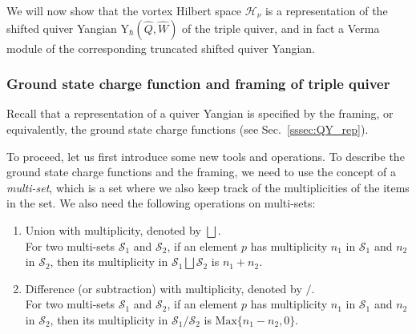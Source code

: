 \documentclass[12pt,a4paper]{article}
\renewcommand{\(}{\left(}
\renewcommand{\)}{\right)}
\renewcommand{\(}{\left(}
\renewcommand{\)}{\right)}
\begin{document}
We will now  show that the vortex Hilbert space $\mathcal{H}_\nu$ is a representation of the shifted quiver Yangian Y$_{\hbar}(\widehat{Q},\widehat{W})$ of the triple quiver, and in fact a Verma module of the corresponding truncated shifted quiver Yangian. 


\subsubsection{Ground state charge function  and framing of triple quiver}
\label{sssec:mono_as_QY}

Recall that a representation of a quiver Yangian is specified by the framing, or equivalently, the ground state charge functions (see Sec.~\ref{sssec:QY_rep}).

To proceed, let us first introduce some new tools and operations. 
To describe the ground state charge functions and the framing, we need to use the concept of a \textit{multi-set}, which is a set where we also keep track of the multiplicities of the items in the set.
We also need the following operations on multi-sets:
\begin{enumerate}
\item Union with multiplicity,  denoted by $\bigsqcup$. \\
For two multi-sets $\mathcal{S}_1$ and $\mathcal{S}_2$, if an element $p$ has multiplicity $n_1$ in $\mathcal{S}_1$ and $n_2$ in $\mathcal{S}_2$, then its multiplicity in $\mathcal{S}_1\bigsqcup \mathcal{S}_2$ is $n_1+n_2$.
\item  Difference (or subtraction) with multiplicity, denoted by $/$.\\ 
For two multi-sets $\mathcal{S}_1$ and $\mathcal{S}_2$, if an element $p$ has multiplicity $n_1$ in $\mathcal{S}_1$ and $n_2$ in $\mathcal{S}_2$, then its multiplicity in $\mathcal{S}_1 / \mathcal{S}_2$ is $\mathrm{Max}\{n_1-n_2,0\}$.
\end{enumerate}
    
\end{document}
